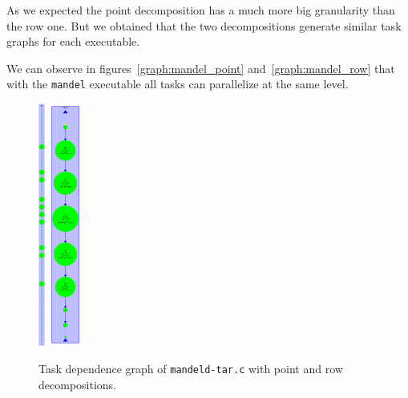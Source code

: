 As we expected the point decomposition has a much more big granularity than the row one. But we obtained that the two decompositions generate similar task graphs for each executable.

We can observe in figures~\ref{graph:mandel_point} and~\ref{graph:mandel_row} that with the \texttt{mandel} executable all tasks can parallelize at the same level.



\begin{figure}[H]
\centering
\includegraphics[height=8cm]{plots/dependency_graph_mandeld_point.png}
\hspace{5em}
\includegraphics[height=8cm]{plots/dependency_graph_mandeld_row.pdf}
\caption{Task dependence graph of \texttt{mandeld-tar.c} with point and row decompositions.}
\label{graph:mandeld_point_and_row}
\end{figure}



